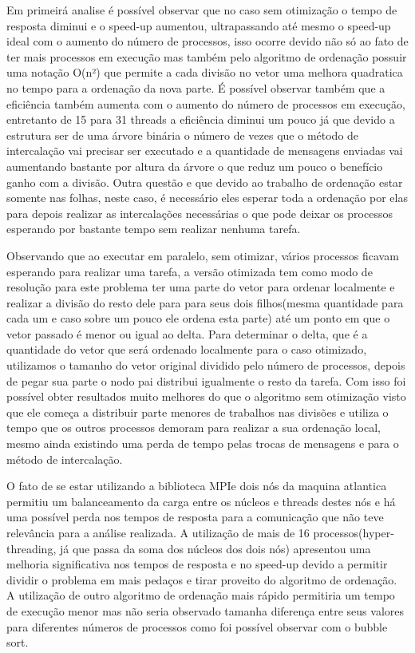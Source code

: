 \documentclass[11pt]{IEEEtran}
\begin{document}
Em primeirá analise é possível observar que no caso sem otimização o tempo de
resposta diminui e o speed-up aumentou, ultrapassando até mesmo o speed-up ideal
com o aumento do número de processos, isso ocorre devido não só ao fato de ter
mais processos em execução mas também pelo algoritmo de ordenação possuir uma
notação O(n²) que permite a cada divisão no vetor uma melhora quadratica no
tempo para a ordenação da nova parte. É possível observar também que a
eficiência também aumenta com o aumento do número de processos em execução,
entretanto de 15 para 31 threads a eficiência diminui um pouco já que devido a
estrutura ser de uma árvore binária o número de vezes que o método de
intercalação vai precisar ser executado e a quantidade de mensagens enviadas vai
aumentando bastante por altura da árvore o que reduz um pouco o benefício ganho
com a divisão. Outra questão e que devido ao trabalho de ordenação estar somente
nas folhas, neste caso, é necessário eles esperar toda a ordenação por elas para
depois realizar as intercalações necessárias o que pode deixar os processos
esperando por bastante tempo sem realizar nenhuma tarefa.

Observando que ao executar em paralelo, sem otimizar, vários processos ficavam
esperando para realizar uma tarefa, a versão otimizada tem como modo de
resolução para este problema ter uma parte do vetor para ordenar localmente e
realizar a divisão do resto dele para para seus dois filhos(mesma quantidade
para cada um e caso sobre um pouco ele ordena esta parte) até um ponto em que o
vetor passado é menor ou igual ao delta. Para determinar o delta, que é a
quantidade do vetor que será ordenado localmente para o caso otimizado,
utilizamos o tamanho do vetor original dividido pelo número de processos, depois
de pegar sua parte o nodo pai distribui igualmente o resto da tarefa. Com isso
foi possível obter resultados muito melhores do que o algoritmo sem otimização
visto que ele começa a distribuir parte menores de trabalhos nas divisões e
utiliza o tempo que os outros processos  demoram para realizar a sua ordenação
local, mesmo ainda existindo uma perda de tempo pelas trocas de mensagens e para
o método de intercalação.

O fato de se estar utilizando a biblioteca MPI\@ e dois nós da maquina atlantica
permitiu um balanceamento da carga entre os núcleos e threads destes nós e há
uma possível perda nos tempos de resposta para a comunicação que não teve
relevância para a análise realizada. A utilização de mais de 16
processos(hyper-threading, já que passa da soma dos núcleos dos dois nós)
apresentou uma melhoria significativa nos tempos de resposta e no speed-up
devido a permitir dividir o problema em mais pedaços e tirar proveito do
algoritmo de ordenação. A utilização de outro algoritmo de ordenação mais rápido
permitiria um tempo de execução menor mas não seria observado tamanha diferença
entre seus valores para diferentes números de processos como foi possível
observar com o bubble sort.
\end{document}
